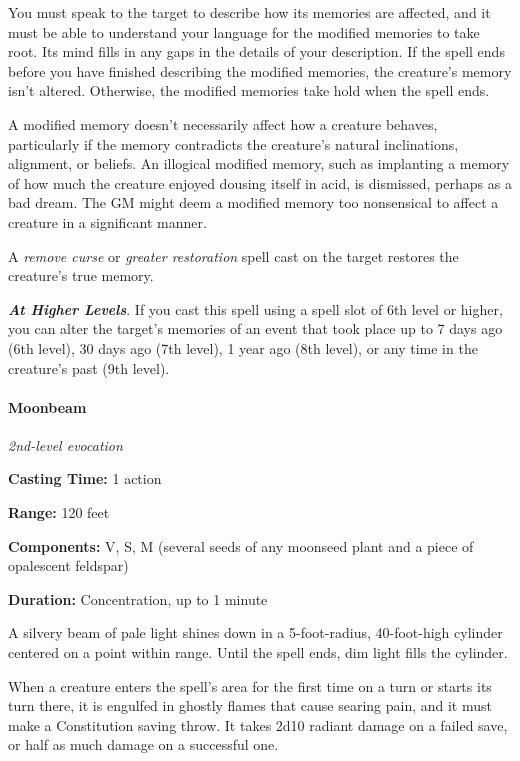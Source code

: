\documentclass[
]{article}
\begin{document}
You must speak to the target to describe how its memories are affected,
and it must be able to understand your language for the modified
memories to take root. Its mind fills in any gaps in the details of your
description. If the spell ends before you have finished describing the
modified memories, the creature's memory isn't altered. Otherwise, the
modified memories take hold when the spell ends.

A modified memory doesn't necessarily affect how a creature behaves,
particularly if the memory contradicts the creature's natural
inclinations, alignment, or beliefs. An illogical modified memory, such
as implanting a memory of how much the creature enjoyed dousing itself
in acid, is dismissed, perhaps as a bad dream. The GM might deem a
modified memory too nonsensical to affect a creature in a significant
manner.

A \emph{remove curse} or \emph{greater restoration} spell cast on the
target restores the creature's true memory.

\emph{\textbf{At Higher Levels}}. If you cast this spell using a spell
slot of 6th level or higher, you can alter the target's memories of an
event that took place up to 7 days ago (6th level), 30 days ago (7th
level), 1 year ago (8th level), or any time in the creature's past (9th
level).

\hypertarget{moonbeam}{%
\paragraph{Moonbeam}\label{moonbeam}}

\emph{2nd-level evocation}

\textbf{Casting Time:} 1 action

\textbf{Range:} 120 feet

\textbf{Components:} V, S, M (several seeds of any moonseed plant and a
piece of opalescent feldspar)

\textbf{Duration:} Concentration, up to 1 minute

A silvery beam of pale light shines down in a 5-foot-radius,
40-foot-high cylinder centered on a point within range. Until the spell
ends, dim light fills the cylinder.

When a creature enters the spell's area for the first time on a turn or
starts its turn there, it is engulfed in ghostly flames that cause
searing pain, and it must make a Constitution saving throw. It takes
2d10 radiant damage on a failed save, or half as much damage on a
successful one.
\end{document}
